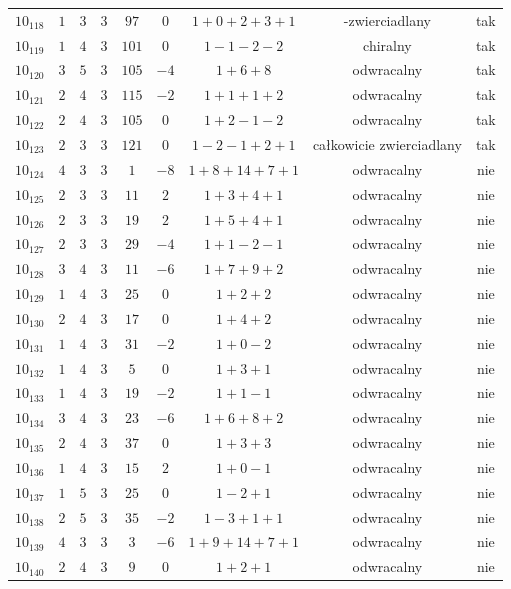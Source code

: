 \begin{longtable}{ccccccccc}
$10_{118}$ & $1$ & $3$ & $3$ & $97$ & $0$ & $1+0+2+3+1$ & -zwierciadlany & tak \\
$10_{119}$ & $1$ & $4$ & $3$ & $101$ & $0$ & $1-1-2-2$ & chiralny & tak \\
$10_{120}$ & $3$ & $5$ & $3$ & $105$ & $-4$ & $1+6+8$ & odwracalny & tak \\
$10_{121}$ & $2$ & $4$ & $3$ & $115$ & $-2$ & $1+1+1+2$ & odwracalny & tak \\
$10_{122}$ & $2$ & $4$ & $3$ & $105$ & $0$ & $1+2-1-2$ & odwracalny & tak \\
$10_{123}$ & $2$ & $3$ & $3$ & $121$ & $0$ & $1-2-1+2+1$ & całkowicie zwierciadlany & tak \\
$10_{124}$ & $4$ & $3$ & $3$ & $1$ & $-8$ & $1+8+14+7+1$ & odwracalny & nie \\
$10_{125}$ & $2$ & $3$ & $3$ & $11$ & $2$ & $1+3+4+1$ & odwracalny & nie \\
$10_{126}$ & $2$ & $3$ & $3$ & $19$ & $2$ & $1+5+4+1$ & odwracalny & nie \\
$10_{127}$ & $2$ & $3$ & $3$ & $29$ & $-4$ & $1+1-2-1$ & odwracalny & nie \\
$10_{128}$ & $3$ & $4$ & $3$ & $11$ & $-6$ & $1+7+9+2$ & odwracalny & nie \\
$10_{129}$ & $1$ & $4$ & $3$ & $25$ & $0$ & $1+2+2$ & odwracalny & nie \\
$10_{130}$ & $2$ & $4$ & $3$ & $17$ & $0$ & $1+4+2$ & odwracalny & nie \\
$10_{131}$ & $1$ & $4$ & $3$ & $31$ & $-2$ & $1+0-2$ & odwracalny & nie \\
$10_{132}$ & $1$ & $4$ & $3$ & $5$ & $0$ & $1+3+1$ & odwracalny & nie \\
$10_{133}$ & $1$ & $4$ & $3$ & $19$ & $-2$ & $1+1-1$ & odwracalny & nie \\
$10_{134}$ & $3$ & $4$ & $3$ & $23$ & $-6$ & $1+6+8+2$ & odwracalny & nie \\
$10_{135}$ & $2$ & $4$ & $3$ & $37$ & $0$ & $1+3+3$ & odwracalny & nie \\
$10_{136}$ & $1$ & $4$ & $3$ & $15$ & $2$ & $1+0-1$ & odwracalny & nie \\
$10_{137}$ & $1$ & $5$ & $3$ & $25$ & $0$ & $1-2+1$ & odwracalny & nie \\
$10_{138}$ & $2$ & $5$ & $3$ & $35$ & $-2$ & $1-3+1+1$ & odwracalny & nie \\
$10_{139}$ & $4$ & $3$ & $3$ & $3$ & $-6$ & $1+9+14+7+1$ & odwracalny & nie \\
$10_{140}$ & $2$ & $4$ & $3$ & $9$ & $0$ & $1+2+1$ & odwracalny & nie \\

\end{longtable}
